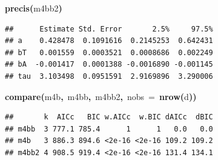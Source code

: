 \documentclass{article}
\makeatletter
\newcommand{\hlfunctioncall}[1]{\textcolor[rgb]{.5,0,.33}{\textbf{#1}}}%
\newcommand{\hlkeyword}[1]{\textbf{#1}}%
\newcommand{\hlargument}[1]{\textcolor[rgb]{.69,.25,.02}{#1}}%
\newcommand{\hlsymbol}[1]{#1}%
\newenvironment{kframe}{%
 \def\FrameCommand##1{\hskip\@totalleftmargin \hskip-\fboxsep
 \colorbox{shadecolor}{##1}\hskip-\fboxsep
     \hskip-\linewidth \hskip-\@totalleftmargin \hskip\columnwidth}%
 \MakeFramed {\advance\hsize-\width
   \@totalleftmargin\z@ \linewidth\hsize
   \@setminipage}}%
 {\par\unskip\endMakeFramed}
\newenvironment{knitrout}{}{} %
\makeatother
\begin{document}
\begin{knitrout}
{\begin{kframe}
\begin{verbatim}
\end{verbatim}
\begin{flushleft}
\ttfamily\noindent
\hlfunctioncall{precis}\hlkeyword{(}\hlsymbol{m4bb2}\hlkeyword{)}\mbox{}
\normalfont
\end{flushleft}
\begin{verbatim}
##      Estimate Std. Error       2.5%     97.5%
## a    0.428478  0.1091616  0.2145253  0.642431
## bT   0.001559  0.0003521  0.0008686  0.002249
## bA  -0.001417  0.0001388 -0.0016890 -0.001145
## tau  3.103498  0.0951591  2.9169896  3.290006
\end{verbatim}
\begin{flushleft}
\ttfamily\noindent
\hlfunctioncall{compare}\hlkeyword{(}\hlsymbol{m4b}\hlkeyword{,}{\ }\hlsymbol{m4bb}\hlkeyword{,}{\ }\hlsymbol{m4bb2}\hlkeyword{,}{\ }\hlargument{nobs}{\ }\hlargument{=}{\ }\hlfunctioncall{nrow}\hlkeyword{(}\hlsymbol{d}\hlkeyword{)}\hlkeyword{)}\mbox{}
\normalfont
\end{flushleft}
\begin{verbatim}
##       k  AICc   BIC w.AICc  w.BIC dAICc  dBIC
## m4bb  3 777.1 785.4      1      1   0.0   0.0
## m4b   3 886.3 894.6 <2e-16 <2e-16 109.2 109.2
## m4bb2 4 908.5 919.4 <2e-16 <2e-16 131.4 134.1
\end{verbatim}
\end{kframe}}
\end{knitrout}
\end{document}
